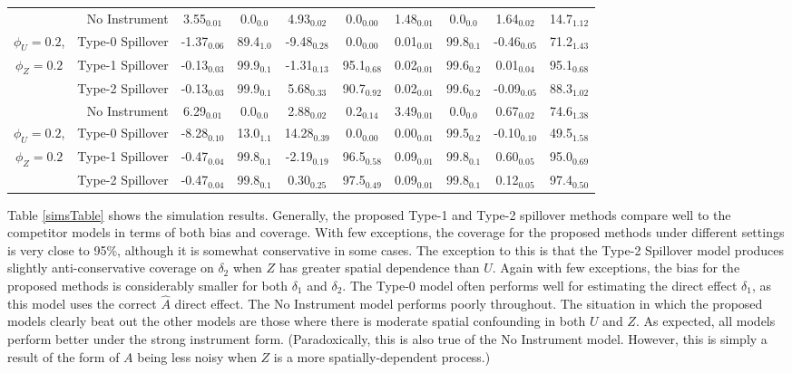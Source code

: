 \documentclass[12pt]{article}
\begin{document}
\begin{table}
\begin{tabular}{c|r|cccc|cccc}
\hline
& No Instrument & 3.55$_{0.01}$ & 0.0$_{0.0}$ & 4.93$_{0.02}$ & 0.0$_{0.00}$ & 1.48$_{0.01}$ & 0.0$_{0.0}$ & 1.64$_{0.02}$ & 14.7$_{1.12}$ \\
$\phi_U=0.2$,& Type-0 Spillover &-1.37$_{0.06}$ & 89.4$_{1.0}$ & -9.48$_{0.28}$ & 0.0$_{0.00}$ & 0.01$_{0.01}$ & 99.8$_{0.1}$ & -0.46$_{0.05}$ & 71.2$_{1.43}$ \\
$\phi_Z=0.2$& Type-1 Spillover &-0.13$_{0.03}$ & 99.9$_{0.1}$ & -1.31$_{0.13}$ & 95.1$_{0.68}$ & 0.02$_{0.01}$ & 99.6$_{0.2}$ & 0.01$_{0.04}$ & 95.1$_{0.68}$ \\
& Type-2 Spillover &  -0.13$_{0.03}$ & 99.9$_{0.1}$ & 5.68$_{0.33}$ & 90.7$_{0.92}$ & 0.02$_{0.01}$ & 99.6$_{0.2}$ & -0.09$_{0.05}$ & 88.3$_{1.02}$ \\
\hline
& No Instrument & 6.29$_{0.01}$ & 0.0$_{0.0}$ & 2.88$_{0.02}$ & 0.2$_{0.14}$ & 3.49$_{0.01}$ & 0.0$_{0.0}$ & 0.67$_{0.02}$ & 74.6$_{1.38}$ \\
$\phi_U=0.2$,& Type-0 Spillover &-8.28$_{0.10}$ & 13.0$_{1.1}$ & 14.28$_{0.39}$ & 0.0$_{0.00}$ & 0.00$_{0.01}$ & 99.5$_{0.2}$ & -0.10$_{0.10}$ & 49.5$_{1.58}$ \\
$\phi_Z=0.2$& Type-1 Spillover &-0.47$_{0.04}$ & 99.8$_{0.1}$ & -2.19$_{0.19}$ & 96.5$_{0.58}$ & 0.09$_{0.01}$ & 99.8$_{0.1}$ & 0.60$_{0.05}$ & 95.0$_{0.69}$ \\
& Type-2 Spillover & -0.47$_{0.04}$ & 99.8$_{0.1}$ & 0.30$_{0.25}$ & 97.5$_{0.49}$ & 0.09$_{0.01}$ & 99.8$_{0.1}$ & 0.12$_{0.05}$ & 97.4$_{0.50}$ 
\end{tabular}
\end{table}

\normalsize

Table \ref{simsTable} shows the simulation results. Generally, the proposed Type-1 and Type-2 spillover methods compare well to the competitor models in terms of both bias and coverage. With few exceptions, the coverage for the proposed methods under different settings is very close to 95\%, although it is somewhat conservative in some cases. The exception to this is that the Type-2 Spillover model produces slightly anti-conservative coverage on $\delta_2$ when $Z$ has greater spatial dependence than $U$. Again with few exceptions, the bias for the proposed methods is considerably smaller for both $\delta_1$ and $\delta_2$. 
The Type-0 model often performs well for estimating the direct effect $\delta_1$, as this model uses the correct $\hat{A}$ direct effect. The No Instrument model performs poorly throughout. The situation in which the proposed models clearly beat out the other models are those where there is moderate spatial confounding in both $U$ and $Z$. As expected, all models perform better under the strong instrument form. (Paradoxically, this is also true of the No Instrument model. However, this is simply a result of the form of $A$ being less noisy when $Z$ is a more spatially-dependent process.) 
\end{document}
